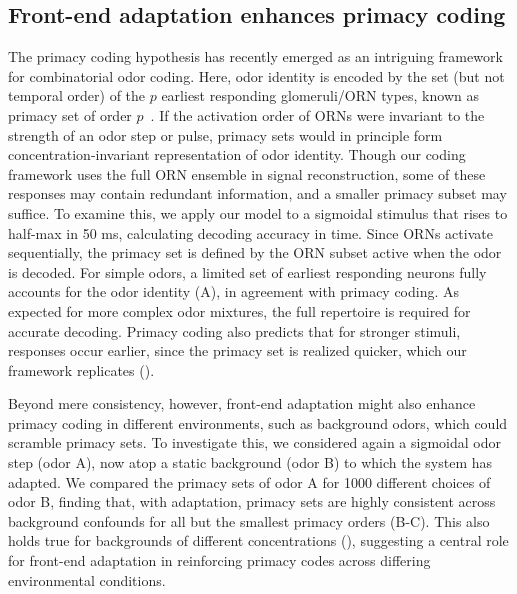 \documentclass[9pt,lineno]{elife}
\begin{document}




\subsection{Front-end adaptation enhances primacy coding}

The primacy coding hypothesis has recently emerged as an intriguing framework for combinatorial odor coding. Here, odor identity is encoded by the set (but not temporal order) of the $p$ earliest responding glomeruli/ORN types, known as primacy set of order $p$~\citep{primacy_coding}. If the activation order of ORNs were invariant to the strength of an odor step or pulse, primacy sets would in principle form concentration-invariant representation of odor identity. Though our coding framework uses the full ORN ensemble in signal reconstruction, some of these responses may contain redundant information, and a smaller primacy subset may suffice. To examine this, we apply our model to a sigmoidal stimulus that rises to half-max in 50 ms, calculating decoding accuracy in time. Since ORNs activate sequentially, the primacy set is defined by the ORN subset active when the odor is decoded. For simple odors, a limited set of earliest responding neurons fully accounts for the odor identity (A), in agreement with primacy coding. As expected for more complex odor mixtures, the full repertoire is required for accurate decoding. Primacy coding also predicts that for stronger stimuli, responses occur earlier, since the primacy set is realized quicker, which our framework replicates ().

Beyond mere consistency, however, front-end adaptation might also enhance primacy coding in different environments, such as background odors, which could scramble primacy sets. To investigate this, we considered again a sigmoidal odor step (odor A), now atop a static background (odor B) to which the system has adapted. We compared the primacy sets of odor A for 1000 different choices of odor B, finding that, with adaptation, primacy sets are highly consistent across background confounds for all but the smallest primacy orders (B-C). This also holds true for backgrounds of different concentrations (), suggesting a central role for front-end adaptation in reinforcing primacy codes across differing environmental conditions. 
\end{document}
